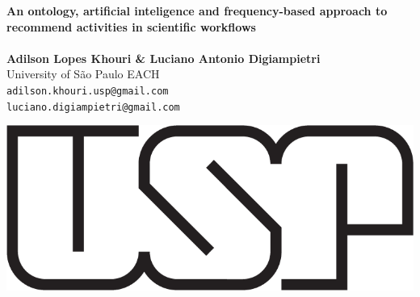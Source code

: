 \documentclass[40pt, a0, portrait]{a0poster}
\begin{document}


\begin{minipage}[b]{0.75\linewidth}
\veryHuge \color{NavyBlue} \textbf{An ontology, artificial inteligence and
frequency-based approach to recommend activities in
scientific workflows} \color{Black}\\ %
\\
\huge \textbf{Adilson Lopes Khouri \& Luciano Antonio Digiampietri}\\[0.5cm] %
\huge University of São Paulo EACH\\[0.4cm] %
\Large \texttt{adilson.khouri.usp@gmail.com} \\
\Large \texttt{luciano.digiampietri@gmail.com}
\end{minipage}
%
\begin{minipage}[b]{0.25\linewidth}
\includegraphics[width=20cm]{usp.png}\\
\end{minipage}

\vspace{1cm} %

\end{document}
